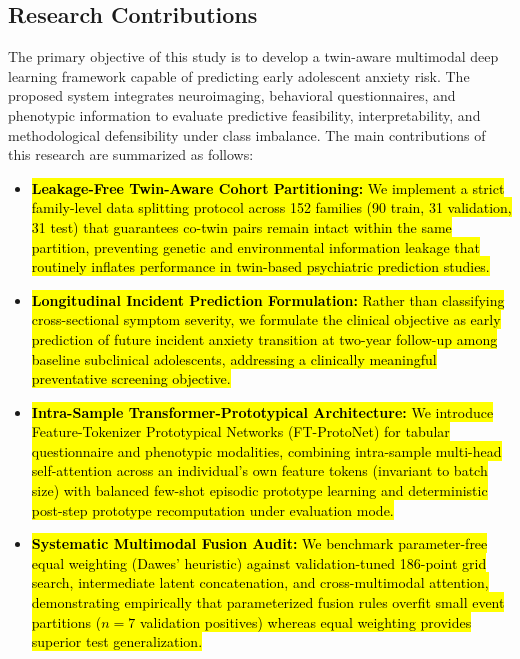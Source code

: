 \documentclass[10pt,letterpaper]{article}
\begin{document}
                \subsection*{Research Contributions}

        The primary objective of this study is to develop a twin-aware
        multimodal deep learning framework capable of predicting early
        adolescent anxiety risk. The proposed system integrates
        neuroimaging, behavioral questionnaires, and phenotypic
        information to evaluate predictive feasibility, interpretability,
        and methodological defensibility under class imbalance. The main contributions of this research
        are summarized as follows:

        \begin{itemize}
        
        \item \hl{\textbf{Leakage-Free Twin-Aware Cohort Partitioning:} We implement a strict family-level data splitting protocol across 152 families (90 train, 31 validation, 31 test) that guarantees co-twin pairs remain intact within the same partition, preventing genetic and environmental information leakage that routinely inflates performance in twin-based psychiatric prediction studies.}
        
        \item \hl{\textbf{Longitudinal Incident Prediction Formulation:} Rather than classifying cross-sectional symptom severity, we formulate the clinical objective as early prediction of future incident anxiety transition at two-year follow-up among baseline subclinical adolescents, addressing a clinically meaningful preventative screening objective.}
        
        \item \hl{\textbf{Intra-Sample Transformer-Prototypical Architecture:} We introduce Feature-Tokenizer Prototypical Networks (FT-ProtoNet) for tabular questionnaire and phenotypic modalities, combining intra-sample multi-head self-attention across an individual's own feature tokens (invariant to batch size) with balanced few-shot episodic prototype learning and deterministic post-step prototype recomputation under evaluation mode.}
        
        \item \hl{\textbf{Systematic Multimodal Fusion Audit:} We benchmark parameter-free equal weighting (Dawes' heuristic) against validation-tuned 186-point grid search, intermediate latent concatenation, and cross-multimodal attention, demonstrating empirically that parameterized fusion rules overfit small event partitions ($n=7$ validation positives) whereas equal weighting provides superior test generalization.}
        

\end{itemize}
\end{document}
